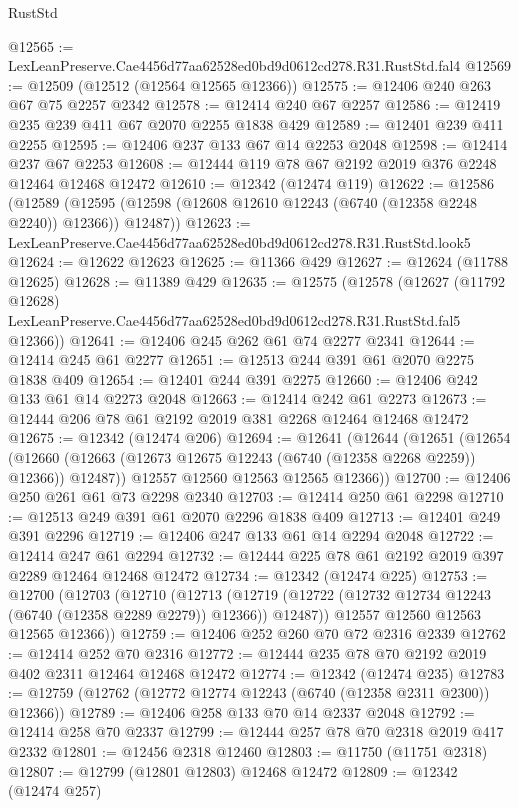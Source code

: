 \begin{lexlean}{RustStd}
\begin{coremodule}
@12565 := LexLeanPreserve.Cae4456d77aa62528ed0bd9d0612cd278.R31.RustStd.fal4
@12569 := @12509 (@12512 (@12564 @12565 @12366))
@12575 := @12406 @240 @263 @67 @75 @2257 @2342
@12578 := @12414 @240 @67 @2257
@12586 := @12419 @235 @239 @411 @67 @2070 @2255 @1838 @429
@12589 := @12401 @239 @411 @2255
@12595 := @12406 @237 @133 @67 @14 @2253 @2048
@12598 := @12414 @237 @67 @2253
@12608 := @12444 @119 @78 @67 @2192 @2019 @376 @2248 @12464 @12468 @12472
@12610 := @12342 (@12474 @119)
@12622 := @12586
    (@12589 (@12595 (@12598 (@12608 @12610 @12243 (@6740 (@12358 @2248 @2240)) @12366)) @12487))
@12623 := LexLeanPreserve.Cae4456d77aa62528ed0bd9d0612cd278.R31.RustStd.look5
@12624 := @12622 @12623
@12625 := @11366 @429
@12627 := @12624 (@11788 @12625)
@12628 := @11389 @429
@12635 := @12575
    (@12578
      (@12627
        (@11792 @12628)
        LexLeanPreserve.Cae4456d77aa62528ed0bd9d0612cd278.R31.RustStd.fal5
        @12366))
@12641 := @12406 @245 @262 @61 @74 @2277 @2341
@12644 := @12414 @245 @61 @2277
@12651 := @12513 @244 @391 @61 @2070 @2275 @1838 @409
@12654 := @12401 @244 @391 @2275
@12660 := @12406 @242 @133 @61 @14 @2273 @2048
@12663 := @12414 @242 @61 @2273
@12673 := @12444 @206 @78 @61 @2192 @2019 @381 @2268 @12464 @12468 @12472
@12675 := @12342 (@12474 @206)
@12694 := @12641
    (@12644
      (@12651
        (@12654 (@12660 (@12663 (@12673 @12675 @12243 (@6740 (@12358 @2268 @2259)) @12366)) @12487))
        @12557
        @12560
        @12563
        @12565
        @12366))
@12700 := @12406 @250 @261 @61 @73 @2298 @2340
@12703 := @12414 @250 @61 @2298
@12710 := @12513 @249 @391 @61 @2070 @2296 @1838 @409
@12713 := @12401 @249 @391 @2296
@12719 := @12406 @247 @133 @61 @14 @2294 @2048
@12722 := @12414 @247 @61 @2294
@12732 := @12444 @225 @78 @61 @2192 @2019 @397 @2289 @12464 @12468 @12472
@12734 := @12342 (@12474 @225)
@12753 := @12700
    (@12703
      (@12710
        (@12713 (@12719 (@12722 (@12732 @12734 @12243 (@6740 (@12358 @2289 @2279)) @12366)) @12487))
        @12557
        @12560
        @12563
        @12565
        @12366))
@12759 := @12406 @252 @260 @70 @72 @2316 @2339
@12762 := @12414 @252 @70 @2316
@12772 := @12444 @235 @78 @70 @2192 @2019 @402 @2311 @12464 @12468 @12472
@12774 := @12342 (@12474 @235)
@12783 := @12759 (@12762 (@12772 @12774 @12243 (@6740 (@12358 @2311 @2300)) @12366))
@12789 := @12406 @258 @133 @70 @14 @2337 @2048
@12792 := @12414 @258 @70 @2337
@12799 := @12444 @257 @78 @70 @2318 @2019 @417 @2332
@12801 := @12456 @2318 @12460
@12803 := @11750 (@11751 @2318)
@12807 := @12799 (@12801 @12803) @12468 @12472
@12809 := @12342 (@12474 @257)

\end{coremodule}
\end{lexlean}
